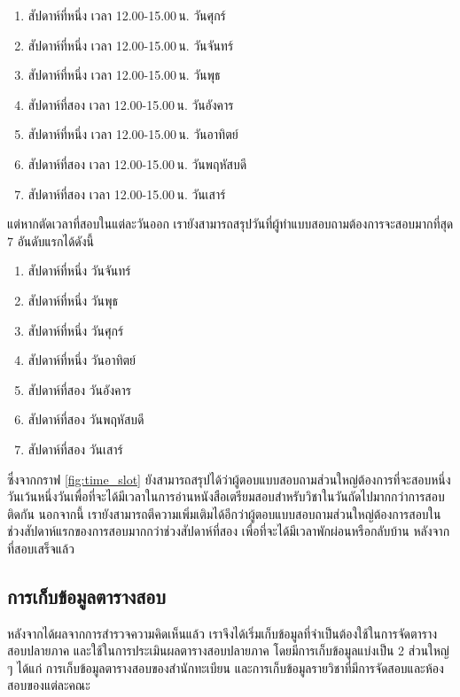 \begin{enumerate}
  \item สัปดาห์ที่หนึ่ง เวลา 12.00-15.00\,น. วันศุกร์ 
  \item สัปดาห์ที่หนึ่ง เวลา 12.00-15.00\,น. วันจันทร์
  \item สัปดาห์ที่หนึ่ง เวลา 12.00-15.00\,น. วันพุธ
  \item สัปดาห์ที่สอง เวลา 12.00-15.00\,น. วันอังคาร
  \item สัปดาห์ที่หนึ่ง เวลา 12.00-15.00\,น. วันอาทิตย์
  \item สัปดาห์ที่สอง เวลา 12.00-15.00\,น. วันพฤหัสบดี
  \item สัปดาห์ที่สอง เวลา 12.00-15.00\,น. วันเสาร์
\end{enumerate}

แต่หากตัดเวลาที่สอบในแต่ละวันออก เรายังสามารถสรุปวันที่ผู้ทำแบบสอบถามต้องการจะสอบมากที่สุด 7 อันดับแรกได้ดังนี้
\begin{enumerate}
  \item สัปดาห์ที่หนึ่ง วันจันทร์
  \item สัปดาห์ที่หนึ่ง วันพุธ
  \item สัปดาห์ที่หนึ่ง วันศุกร์ 
  \item สัปดาห์ที่หนึ่ง วันอาทิตย์
  \item สัปดาห์ที่สอง วันอังคาร
  \item สัปดาห์ที่สอง วันพฤหัสบดี
  \item สัปดาห์ที่สอง วันเสาร์
\end{enumerate}
ซึ่งจากกราฟ \ref{fig:time_slot} ยังสามารถสรุปได้ว่าผู้ตอบแบบสอบถามส่วนใหญ่ต้องการที่จะสอบหนึ่งวันเว้นหนึ่งวันเพื่อที่จะได้มีเวลาในการอ่านหนังสือเตรียมสอบสำหรับวิชาในวันถัดไปมากกว่าการสอบติดกัน 
นอกจากนี้ เรายังสามารถตีความเพิ่มเติมได้อีกว่าผู้ตอบแบบสอบถามส่วนใหญ่ต้องการสอบในช่วงสัปดาห์แรกของการสอบมากกว่าช่วงสัปดาห์ที่สอง เพื่อที่จะได้มีเวลาพักผ่อนหรือกลับบ้าน หลังจากที่สอบเสร็จแล้ว

\subsection{การเก็บข้อมูลตารางสอบ}
หลังจากได้ผลจากการสำรวจความคิดเห็นแล้ว เราจึงได้เริ่มเก็บข้อมูลที่จำเป็นต้องใช้ในการจัดตารางสอบปลายภาค และใช้ในการประเมินผลตารางสอบปลายภาค 
โดยมีการเก็บข้อมูลแบ่งเป็น 2 ส่วนใหญ่ ๆ ได้แก่ การเก็บข้อมูลตารางสอบของสำนักทะเบียน และการเก็บข้อมูลรายวิชาที่มีการจัดสอบและห้องสอบของแต่ละคณะ



